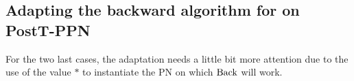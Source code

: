 \subsection{Adapting the backward algorithm for \Ecov on PostT-\ac{PPN}}

For the two last cases, the adaptation needs a little bit more attention due to the use of the value $*$ to instantiate the \ac{PN} on which $\operatorname{Back}$ will work.

